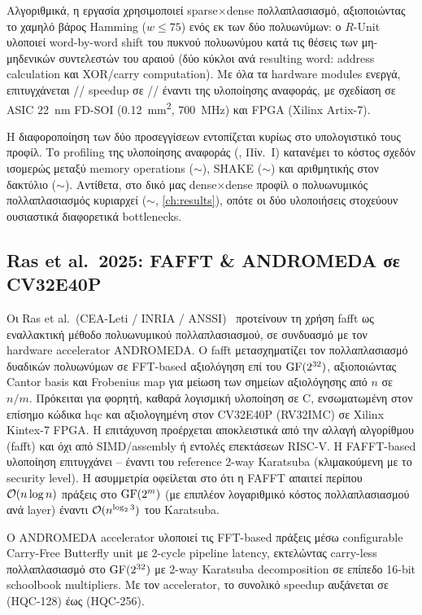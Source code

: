 Αλγοριθμικά, η εργασία χρησιμοποιεί sparse$\times$dense πολλαπλασιασμό,
αξιοποιώντας το χαμηλό βάρος Hamming ($w \leq 75$) ενός εκ των δύο πολυωνύμων: ο
$R$-Unit υλοποιεί word-by-word shift του πυκνού πολυωνύμου κατά τις θέσεις των
μη-μηδενικών συντελεστών του αραιού (δύο κύκλοι ανά resulting word: address
calculation και XOR/carry computation). Με όλα τα hardware modules ενεργά,
επιτυγχάνεται // speedup σε \KeyGen/\Encaps/\Decaps
έναντι της υλοποίησης αναφοράς, με σχεδίαση σε ASIC \SI{22}{nm} FD-SOI
(\SI{0.12}{mm^2}, \SI{700}{MHz}) και FPGA (Xilinx Artix-7).

Η διαφοροποίηση των δύο προσεγγίσεων εντοπίζεται κυρίως στο 
υπολογιστικό τους προφίλ. Το profiling της υλοποίησης αναφοράς
(\cite{Schoeffel2022-HQC-IoT}, Πίν.~I) κατανέμει το κόστος σχεδόν ισομερώς
μεταξύ memory operations ($\sim$), SHAKE ($\sim$) και
αριθμητικής στον δακτύλιο ($\sim$). Αντίθετα, στο δικό μας
dense$\times$dense προφίλ ο πολυωνυμικός πολλαπλασιασμός κυριαρχεί
($\sim$, \cref{ch:results}), οπότε οι δύο υλοποιήσεις στοχεύουν
ουσιαστικά διαφορετικά bottlenecks.

\subsection{Ras et al.\ 2025: FAFFT \& ANDROMEDA σε CV32E40P}
\label{ssec:rw-ras-fafft}

Οι Ras et al.\ (CEA-Leti / INRIA / ANSSI)~\cite{ras-nist2025} προτείνουν τη
χρήση \gls{fafft} ως εναλλακτική μέθοδο πολυωνυμικού πολλαπλασιασμού, σε
συνδυασμό με τον hardware accelerator ANDROMEDA. Ο \gls{fafft} μετασχηματίζει
τον πολλαπλασιασμό δυαδικών πολυωνύμων σε FFT-based αξιολόγηση επί του
$\mathrm{GF}(2^{32})$, αξιοποιώντας Cantor basis και Frobenius map για μείωση των
σημείων αξιολόγησης από $n$ σε $n/m$. Πρόκειται για φορητή, καθαρά λογισμική
υλοποίηση σε C, ενσωματωμένη στον επίσημο κώδικα \gls{hqc} και αξιολογημένη
στον CV32E40P (RV32IMC) σε Xilinx Kintex-7 FPGA. Η επιτάχυνση προέρχεται
αποκλειστικά από την αλλαγή αλγορίθμου (\gls{fafft}) και όχι από SIMD/assembly
ή εντολές επεκτάσεων RISC-V. Η FAFFT-based υλοποίηση επιτυγχάνει
– έναντι του reference 2-way Karatsuba (κλιμακούμενη
με το security level). Η ασυμμετρία οφείλεται στο ότι η FAFFT απαιτεί περίπου
$\mathcal{O}(n \log n)$ πράξεις στο $\mathrm{GF}(2^m)$ (με επιπλέον λογαριθμικό κόστος
πολλαπλασιασμού ανά layer) έναντι $\mathcal{O}(n^{\log_2 3})$ του Karatsuba.

Ο ANDROMEDA accelerator υλοποιεί τις FFT-based πράξεις μέσω configurable
Carry-Free Butterfly unit με 2-cycle pipeline latency, εκτελώντας carry-less
πολλαπλασιασμό στο $\mathrm{GF}(2^{32})$ με 2-way Karatsuba decomposition σε επίπεδο
16-bit schoolbook multipliers. Με τον accelerator, το συνολικό speedup
αυξάνεται σε  (HQC-128) έως  (HQC-256).

